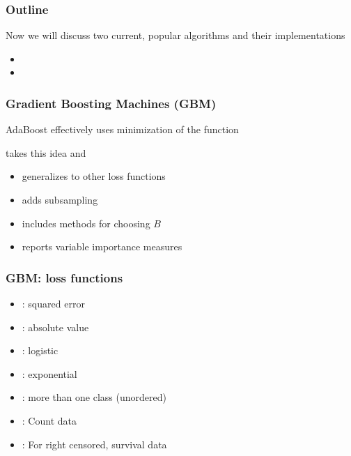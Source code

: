 \documentclass[12pt]{beamer}
\begin{document}
\title{}
\subtitle{\classTitle}
\date{}



\begin{frame}
\maketitle

\organization
%
\end{frame}

\begin{frame}[fragile]
\frametitle{Outline}
Now we will discuss two current, popular algorithms and their  implementations
\vsp

\begin{itemize}
\item {}
\item {}
\end{itemize}
\end{frame}

\begin{frame}[fragile]
\frametitle{Gradient Boosting Machines (GBM)}
 AdaBoost effectively uses  minimization of
the  function

\vsp
{} takes this idea and 
\begin{itemize}
\item generalizes to other loss functions
\item adds subsampling
\item includes methods for choosing $B$
\item reports variable importance measures
\end{itemize}
\end{frame}

\begin{frame}[fragile]
\frametitle{GBM: loss functions}
\begin{itemize}
\item {}: squared error
\item {}: absolute value 
\item {}: logistic 
\item {}: exponential
\item {}: more than one class (unordered)
\item {}: Count data
\item {}: For right censored, survival data
\end{itemize}
\end{frame}
\end{document}
